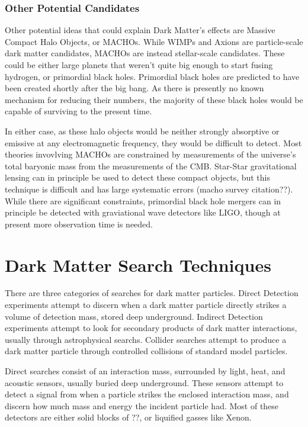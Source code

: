 \subsubsection{Other Potential Candidates}

Other potential ideas that could explain Dark Matter's effects are Massive Compact Halo Objects, or MACHOs.
While WIMPs and Axions are particle-scale dark matter candidates, MACHOs are instead stellar-scale candidates.
These could be either large planets that weren't quite big enough to start fusing hydrogen, or primordial black holes.
Primordial black holes are predicted to have been created shortly after the big bang.
As there is presently no known mechanism for reducing their numbers, the majority of these black holes would be capable of surviving to the present time.

In either case, as these halo objects would be neither strongly absorptive or emissive at any electromagnetic frequency, they would be difficult to detect.
Most theories invovlving MACHOs are constrained by measurements of the universe's total baryonic mass from the measurements of the CMB.
Star-Star gravitational lensing can in principle be used to detect these compact objects, but this technique is difficult and has large systematic errors (macho survey citation??).
While there are significant constraints\cite{pbh_highly_constrained}, primordial black hole mergers can in principle be detected with graviational wave detectors like LIGO\cite{dm_with_ligo}, though at present more observation time is needed.



\section{Dark Matter Search Techniques}


There are three categories of searches for dark matter particles.
Direct Detection experiments attempt to discern when a dark matter particle directly strikes a volume of detection mass, stored deep underground.
Indirect Detection experiments attempt to look for secondary products of dark matter interactions, usually through astrophysical searchs.
Collider searches attempt to produce a dark matter particle through controlled collisions of standard model particles.

Direct searches consist of an interaction mass, surrounded by light, heat, and acoustic sensors, usually buried deep underground.
These sensors attempt to detect a signal from when a particle strikes the enclosed interaction mass, and discern how much mass and energy the incident particle had.
Most of these detectors are either solid blocks of ??, or liquified gasses like Xenon.

